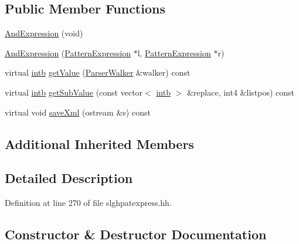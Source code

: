 \subsection*{Public Member Functions}
\begin{DoxyCompactItemize}
\item 
\mbox{\hyperlink{class_and_expression_a63284eb587a74bcc633443dc6f301dfe}{And\+Expression}} (void)
\item 
\mbox{\hyperlink{class_and_expression_a11c0a6760ebcece42effd06af8e2f3b0}{And\+Expression}} (\mbox{\hyperlink{class_pattern_expression}{Pattern\+Expression}} $\ast$l, \mbox{\hyperlink{class_pattern_expression}{Pattern\+Expression}} $\ast$r)
\item 
virtual \mbox{\hyperlink{types_8h_aa925ba3e627c2df89d5b1cfe84fb8572}{intb}} \mbox{\hyperlink{class_and_expression_aaf0fb77253a034fac726186fd0f64cad}{get\+Value}} (\mbox{\hyperlink{class_parser_walker}{Parser\+Walker}} \&walker) const
\item 
virtual \mbox{\hyperlink{types_8h_aa925ba3e627c2df89d5b1cfe84fb8572}{intb}} \mbox{\hyperlink{class_and_expression_ae2df156ce0c2a28f3a677fed7b084d07}{get\+Sub\+Value}} (const vector$<$ \mbox{\hyperlink{types_8h_aa925ba3e627c2df89d5b1cfe84fb8572}{intb}} $>$ \&replace, int4 \&listpos) const
\item 
virtual void \mbox{\hyperlink{class_and_expression_a5e1acc349ab902895d71b6650193e3e3}{save\+Xml}} (ostream \&s) const
\end{DoxyCompactItemize}
\subsection*{Additional Inherited Members}


\subsection{Detailed Description}


Definition at line 270 of file slghpatexpress.\+hh.



\subsection{Constructor \& Destructor Documentation}
\mbox{\label{class_and_expression_a63284eb587a74bcc633443dc6f301dfe}} 
